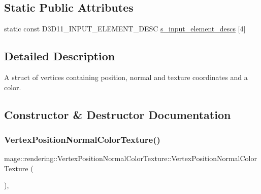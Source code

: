 \subsection*{Static Public Attributes}
\begin{DoxyCompactItemize}
\item 
static const D3\+D11\+\_\+\+I\+N\+P\+U\+T\+\_\+\+E\+L\+E\+M\+E\+N\+T\+\_\+\+D\+E\+SC \hyperlink{structmage_1_1rendering_1_1_vertex_position_normal_color_texture_a7776f639d08c1612e9faa5a328e1ea7b}{s\+\_\+input\+\_\+element\+\_\+descs} \mbox{[}4\mbox{]}
\end{DoxyCompactItemize}


\subsection{Detailed Description}
A struct of vertices containing position, normal and texture coordinates and a color. 

\subsection{Constructor \& Destructor Documentation}
\hypertarget{structmage_1_1rendering_1_1_vertex_position_normal_color_texture_a9655643724642a5d4a3f5baf85340412}{}\label{structmage_1_1rendering_1_1_vertex_position_normal_color_texture_a9655643724642a5d4a3f5baf85340412} 
\subsubsection{\texorpdfstring{Vertex\+Position\+Normal\+Color\+Texture()}{VertexPositionNormalColorTexture()}\hspace{0.1cm}{\footnotesize\ttfamily [1/4]}}
{\footnotesize\ttfamily mage\+::rendering\+::\+Vertex\+Position\+Normal\+Color\+Texture\+::\+Vertex\+Position\+Normal\+Color\+Texture (\begin{DoxyParamCaption}{ }\end{DoxyParamCaption})\hspace{0.3cm}{\ttfamily [default]}, {\ttfamily [noexcept]}}

